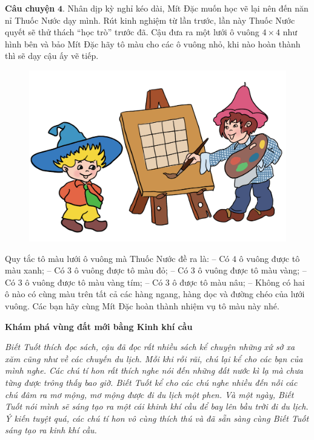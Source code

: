 	\textbf{\color{toancuabi}Câu chuyện} $\pmb{4.}$ Nhân dịp kỳ nghỉ kéo dài, Mít Đặc muốn học vẽ lại nên đến năn nỉ Thuốc Nước dạy mình. Rút kinh nghiệm từ lần trước, lần này Thuốc Nước quyết sẽ thử thách “học trò” trước đã. Cậu đưa ra một lưới ô vuông $4\times 4$ như hình bên và bảo Mít Đặc hãy tô màu cho các ô vuông nhỏ, khi nào hoàn thành thì sẽ dạy cậu ấy vẽ tiếp.
	\begin{figure}[H]
		\centering
		\vspace*{-5pt}
		\captionsetup{labelformat= empty, justification=centering}
		\includegraphics[width=0.6\linewidth]{Hinh6_Mit_dac_Thuoc_nuoc}
		\vspace*{-10pt}
	\end{figure}
	Quy tắc tô màu lưới ô vuông mà Thuốc Nước đề ra là:
	\vskip 0.1cm
	-- Có $4$ ô vuông được tô màu xanh;
	\vskip 0.1cm
	-- Có $3$ ô vuông được tô màu đỏ;
	\vskip 0.1cm
	-- Có $3$ ô vuông được tô màu vàng;
	\vskip 0.1cm
	-- Có $3$ ô vuông được tô màu vàng tím;
	\vskip 0.1cm
	-- Có $3$ ô được tô màu nâu;
	\vskip 0.1cm
	-- Không có hai ô nào có cùng màu trên tất cả các hàng ngang,
	hàng dọc và đường chéo của lưới vuông.
	\vskip 0.1cm
	Các bạn hãy cùng Mít Đặc hoàn thành nhiệm vụ tô màu này nhé.
	\begin{center}
	\end{center}
	\centerline{\textbf{\color{toancuabi}Khám phá vùng đất mới bằng Kinh khí cầu}}
	\vskip 0.1cm
	\textit{Biết Tuốt thích đọc sách, cậu đã đọc rất nhiều sách kể chuyện những xứ sở xa xăm cũng như về các chuyến du lịch. Mỗi khi rỗi rãi, chú lại kể cho các bạn của mình nghe. Các chú tí hon rất thích nghe nói đến những đất nước kì lạ mà chưa từng được trông thấy bao giờ. Biết Tuốt kể cho các chú nghe nhiều đến nỗi các chú đâm ra mơ mộng, mơ mộng được đi du lịch một phen. Và một ngày, Biết Tuốt nói mình sẽ sáng tạo ra một cái khinh khí cầu để bay lên bầu trời đi du lịch. Ý kiến tuyệt quá, các chú tí hon vô cùng thích thú và đã sẵn sàng cùng Biết Tuốt sáng tạo ra kinh khí cầu.}
